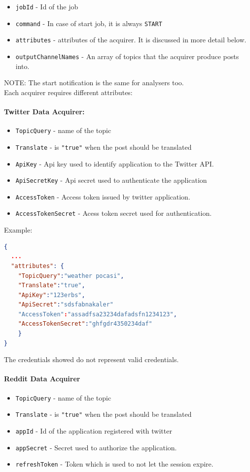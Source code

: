 \begin{itemize}
    \item \texttt{jobId} - Id of the job
    \item \texttt{command} - In case of start job, it is always \texttt{START}
    \item \texttt{attributes} - attributes of the acquirer. It is discussed in more detail below.
    \item \texttt{outputChannelNames} - An array of topics that the acquirer produce posts into.
\end{itemize}

NOTE: The start notification is the same for analysers too.  
\\

Each acquirer requires different attributes:

\paragraph{Twitter Data Acquirer:}
\begin{itemize}
    \item \texttt{TopicQuery} - name of the topic
    \item \texttt{Translate} - is \texttt{"true"} when the post should be translated
    \item \texttt{ApiKey} - Api key used to identify application to the Twitter API.
    \item \texttt{ApiSecretKey} - Api secret  used to authenticate the application
    \item \texttt{AccessToken} - Access token issued by twitter application.
    \item \texttt{AccessTokenSecret} - Acess token secret used for authentication.
\end{itemize}{}

Example: 
\begin{lstlisting}[language=json,firstnumber=1]
{
  ...
  "attributes": {
    "TopicQuery":"weather pocasi",
    "Translate":"true",
    "ApiKey":"123erbs",
    "ApiSecret":"sdsfabnakaler"
    "AccessToken":"assadfsa23234dafadsfn1234123",
    "AccessTokenSecret":"ghfgdr4350234daf"
    }
}
\end{lstlisting}
The credentials showed do not represent valid credentials.

\paragraph{Reddit Data Acquirer}
\begin{itemize}
    \item \texttt{TopicQuery} - name of the topic
    \item \texttt{Translate} - is \texttt{"true"} when the post should be translated
    \item \texttt{appId} - Id of the application registered with twitter
    \item \texttt{appSecret} - Secret used to authorize the application.
    \item \texttt{refreshToken} - Token which is used to not let the session expire.
\end{itemize}{}

